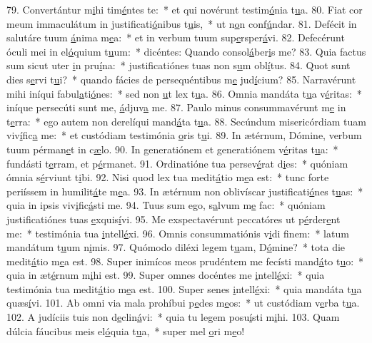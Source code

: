 79. Convertántur m\uline{i}hi tim\uline{é}ntes te:~* et qui novérunt testim\uline{ó}nia t\uline{u}a.
80. Fiat cor meum immaculátum in justificati\uline{ó}nibus t\uline{u}is,~* ut n\uline{o}n conf\uline{ú}ndar.
81. Defécit in salutáre tuum \uline{á}nima m\uline{e}a:~* et in verbum tuum sup\uline{e}rsper\uline{á}vi.
82. Defecérunt óculi mei in el\uline{ó}quium t\uline{u}um:~* dicéntes: Quando consol\uline{á}ber\uline{i}s me?
83. Quia factus sum sicut uter \uline{i}n pru\uline{í}na:~* justificatiónes tuas non s\uline{u}m obl\uline{í}tus.
84. Quot sunt dies s\uline{e}rvi t\uline{u}i?~* quando fácies de persequéntibus m\uline{e} jud\uline{í}cium?
85. Narravérunt mihi iníqui fabul\uline{a}ti\uline{ó}nes:~* sed non \uline{u}t lex t\uline{u}a.
86. Omnia mandáta t\uline{u}a v\uline{é}ritas:~* iníque persecúti sunt me, \uline{á}djuv\uline{a} me.
87. Paulo minus consummavérunt m\uline{e} in t\uline{e}rra:~* ego autem non derelíqui mand\uline{á}ta t\uline{u}a.
88. Secúndum misericórdiam tuam viv\uline{í}fic\uline{a} me:~* et custódiam testimónia \uline{o}ris t\uline{u}i.
89. In ætérnum, Dómine, verbum tuum pérman\uline{e}t in c\uline{æ}lo.
90. In generatiónem et generatiónem v\uline{é}ritas t\uline{u}a:~* fundásti t\uline{e}rram, et p\uline{é}rmanet.
91. Ordinatióne tua persev\uline{é}rat d\uline{i}es:~* quóniam ómnia s\uline{é}rviunt t\uline{i}bi.
92. Nisi quod lex tua medit\uline{á}tio m\uline{e}a est:~* tunc forte periíssem in humilit\uline{á}te m\uline{e}a.
93. In ætérnum non oblivíscar justificati\uline{ó}nes t\uline{u}as:~* quia in ipsis viv\uline{i}fic\uline{á}sti me.
94. Tuus sum ego, s\uline{a}lvum m\uline{e} fac:~* quóniam justificatiónes tuas \uline{e}xquis\uline{í}vi.
95. Me exspectavérunt peccatóres ut p\uline{é}rder\uline{e}nt me:~* testimónia tua \uline{i}ntell\uline{é}xi.
96. Omnis consummatiónis v\uline{i}di f\uline{i}nem:~* latum mandátum t\uline{u}um n\uline{i}mis.
97. Quómodo diléxi legem t\uline{u}am, D\uline{ó}mine?~* tota die medit\uline{á}tio m\uline{e}a est.
98. Super inimícos meos prudéntem me fecísti mand\uline{á}to t\uline{u}o:~* quia in æt\uline{é}rnum m\uline{i}hi est.
99. Super omnes docéntes me \uline{i}ntell\uline{é}xi:~* quia testimónia tua medit\uline{á}tio m\uline{e}a est.
100. Super senes \uline{i}ntell\uline{é}xi:~* quia mandáta t\uline{u}a quæs\uline{í}vi.
101. Ab omni via mala prohíbui p\uline{e}des m\uline{e}os:~* ut custódiam v\uline{e}rba t\uline{u}a.
102. A judíciis tuis non d\uline{e}clin\uline{á}vi:~* quia tu legem posu\uline{í}sti m\uline{i}hi.
103. Quam dúlcia fáucibus meis el\uline{ó}quia t\uline{u}a,~* super mel \uline{o}ri m\uline{e}o!
